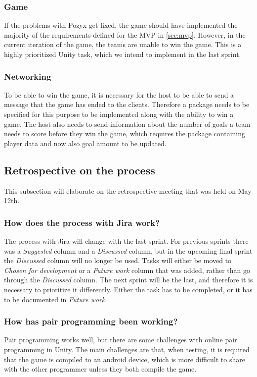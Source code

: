 \subsubsection{Game}
If the problems with Pozyx get fixed, the game should have implemented the majority of the requirements defined for the MVP in \autoref{sec:mvp}.
However, in the current iteration of the game, the teams are unable to win the game.
This is a highly prioritized Unity task, which we intend to implement in the last sprint.

\subsubsection{Networking}
To be able to win the game, it is necessary for the host to be able to send a message that the game has ended to the clients.
Therefore a package needs to be specified for this purpose to be implemented along with the ability to win a game.
The host also needs to send information about the number of goals a team needs to score before they win the game, which requires the package containing player data and now also goal amount to be updated.

\subsection{Retrospective on the process}
This subsection will elaborate on the retrospective meeting that was held on May 12th.

\subsubsection*{How does the process with Jira work?}
The process with Jira will change with the last sprint.
For previous sprints there was a \textit{Suggested} column and a \textit{Discussed} column, but in the upcoming final sprint the \textit{Discussed} column will no longer be used.
Tasks will either be moved to \textit{Chosen for development} or a \textit{Future work} column that was added, rather than go through the \textit{Discussed} column.
The next sprint will be the last, and therefore it is necessary to prioritize it differently.
Either the task has to be completed, or it has to be documented in \textit{Future work}.

\subsubsection*{How has pair programming been working?}
Pair programming works well, but there are some challenges with online pair programming in Unity.
The main challenges are that, when testing, it is required that the game is compiled to an android device, which is more difficult to share with the other programmer unless they both compile the game.

